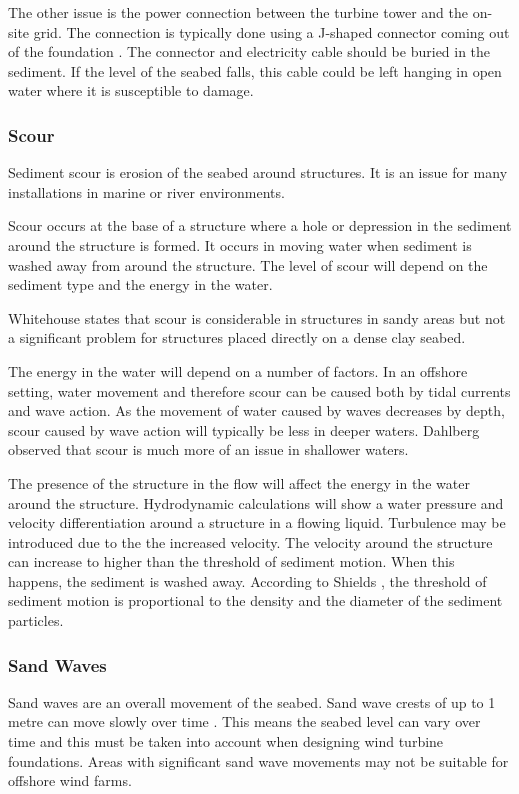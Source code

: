 \documentclass[12pt]{article} %
\begin{document}
The other issue is the power connection between the turbine tower and the on-site grid. The connection is typically done using a J-shaped connector coming out of the foundation \cite{OffshoreWind:1}. The connector and electricity cable should be buried in the sediment. If the level of the seabed falls, this cable could be left hanging in open water where it is susceptible to damage.

\subsubsection{Scour}
Sediment scour is erosion of the seabed around structures. It is an issue for many installations in marine or river environments. 

Scour occurs at the base of a structure where a hole or depression in the sediment around the structure is formed. It occurs in moving water when sediment is washed away from around the structure.
The level of scour will depend on the sediment type and the energy in the water.

Whitehouse \cite{whitehouse} states that scour is considerable in structures in sandy areas but not a significant problem for structures placed directly on a dense clay seabed.

The energy in the water will depend on a number of factors. In an offshore setting, water movement and therefore scour can be caused both by tidal currents and wave action.
As the movement of water caused by waves decreases by depth, scour caused by wave action will typically be less in deeper waters. 
Dahlberg \cite{dahlberg} observed that scour is much more of an issue in shallower waters.

The presence of the structure in the flow will affect the energy in the water around the structure. Hydrodynamic calculations will show a water pressure and velocity differentiation around a structure in a flowing liquid. Turbulence may be introduced due to the the increased velocity.
The velocity around the structure can increase to higher than the threshold of sediment motion. When this happens, the sediment is washed away.
According to Shields \cite{shields_application_1936}, the threshold of sediment motion is proportional to the density and the diameter of the sediment particles.


\subsubsection{Sand Waves}
Sand waves are an overall movement of the seabed. Sand wave crests of up to 1 metre can move slowly over time \cite{byrneocleirigh}. This means the seabed level can vary over time and this must be taken into account when designing wind turbine foundations.
Areas with significant sand wave movements may not be suitable for offshore wind farms.
\end{document}
